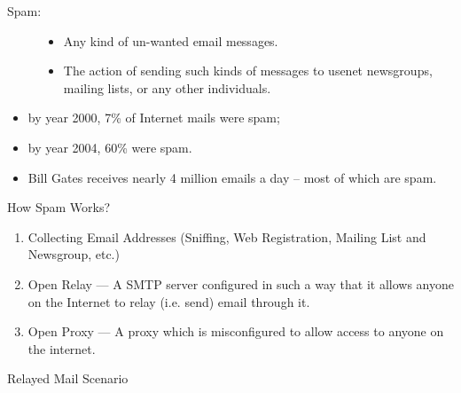 \begin{frame}
  \begin{description}
  \item[Spam:]
    \begin{itemize}
    \item Any kind of un-wanted email messages.
    \item The action of sending such kinds of messages to usenet newsgroups, mailing
      lists, or any other individuals.
    \end{itemize}
  \end{description}
  \begin{itemize}
  \item by year 2000, 7\% of Internet mails were spam;
  \item by year 2004, 60\% were spam.
  \item Bill Gates receives nearly 4 million emails a day -- most of which are spam.
  \end{itemize}
\end{frame}

\begin{frame}{How Spam Works?}
  \begin{enumerate}
  \item Collecting Email Addresses (Sniffing, Web Registration, Mailing List and
    Newsgroup, etc.)
  \item Open Relay --- A SMTP server configured in such a way that it allows anyone on
    the Internet to relay (i.e. send) email through it.
  \item Open Proxy --- A proxy which is misconfigured to allow access to anyone on the
    internet.
  \end{enumerate}
\end{frame}

\begin{frame}{Relayed Mail Scenario}
  \centering
  \mode<beamer>{ \texttt{[image: smtp-relay]} }%
  \label{fig:relay}
\end{frame}


